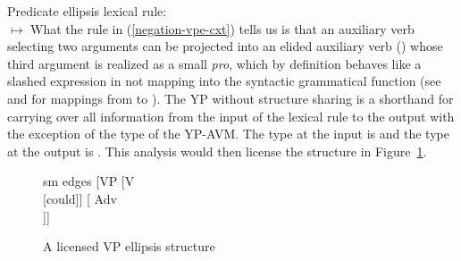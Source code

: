 \documentclass[output=paper
 	        ,biblatex
                ,babelshorthands
                ,newtxmath
                ,draftmode
                ,colorlinks, citecolor=brown
]{langscibook}
\begin{document}
\begin{exe}
\begin{xlist}
\begin{exe}
\begin{xlist}
\ea
\label{negation-vpe-cxt}
Predicate ellipsis lexical rule:\\
  $\mapsto$
\z
%
%
What the rule in (\ref{negation-vpe-cxt}) tells us is that an auxiliary verb selecting two arguments
can be projected into an elided auxiliary verb () whose third
argument is realized as a small \emph{pro}, which by definition
behaves like a slashed expression in not mapping into the syntactic grammatical
 function \comps (see  and  for mappings from
 \argst to \comps). The YP without structure sharing is a shorthand for carrying over all
   information from the input of the lexical rule to the output with the exception of the type of
   the YP-AVM. The type at the input is  and the type at the output is .
This analysis would then license
the structure in Figure~\ref{negation-could-not}.
\begin{figure}
	\begin{forest}
		sm edges
		[VP
			[V\\
					[could]]
			[ Adv\\
					[not]]]
	\end{forest}
\caption{A licensed VP ellipsis structure}\label{negation-could-not}
\end{figure}


\end{xlist}
\end{exe}
\end{xlist}
\end{exe}
\end{document}
